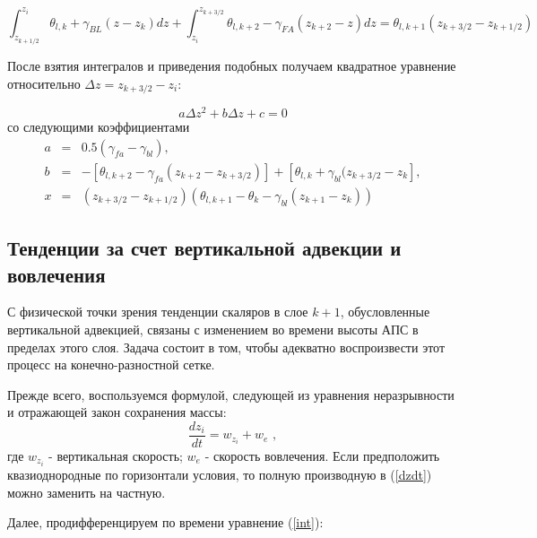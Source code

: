 \documentclass[12pt]{article}
\begin{document}
\begin{equation} \label{int}
 \int_{z_{k+1/2}}^{z_i} \theta_{l,k} + \gamma_{BL} (z - z_k)  dz + \int_{z_i}^{z_{k+3/2}} \theta_{l,k+2} - \gamma_{FA} (z_{k+2} - z)  dz = \theta_{l,k+1} (z_{k+3/2}-z_{k+1/2})
\end{equation}

После взятия интегралов и приведения подобных получаем квадратное уравнение относительно $\Delta z = z_{k+3/2} - z_i$:

\begin{equation}
a \Delta z^2 + b \Delta z + c = 0
\end{equation}
со следующими коэффициентами
\begin{eqnarray}
a &=& 0.5(\gamma_{fa} - \gamma_{bl}) , \\
b &=& - [\theta_{l,k+2} - \gamma_{fa}(z_{k+2} - z_{k+3/2} )] + [\theta_{l,k} + \gamma_{bl} (z_{k+3/2} - z_k ] , \\
x &=& (z_{k+3/2} - z_{k+1/2})(\theta_{l,k+1} - \theta_k - \gamma_{bl} ( z_{k+1} - z_{k})) 
\end{eqnarray}

\subsection{Тенденции за счет вертикальной адвекции и вовлечения}

С физической точки зрения тенденции скаляров в слое $k+1$, обусловленные вертикальной адвекцией, связаны с изменением во времени высоты АПС в пределах этого слоя. Задача состоит в том, чтобы адекватно воспроизвести этот процесс на конечно-разностной сетке.

Прежде всего, воспользуемся формулой, следующей из уравнения неразрывности и отражающей закон сохранения массы:
\begin{equation} \label{dzdt}
\frac{d z_i}{d t} = w_{z_i} + w_e \,\, ,
\end{equation}
где $w_{z_i}$ - вертикальная скорость; $w_e$ - скорость вовлечения. Если предположить квазиоднородные по горизонтали условия, то полную производную в (\ref{dzdt}) можно заменить на частную.

Далее, продифференцируем по времени уравнение (\ref{int}):
\begin{equation}
\end{equation}
\end{document}
